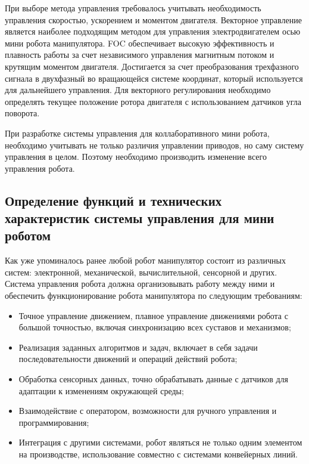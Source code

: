 При выборе метода управления требовалось учитывать необходимость управления скоростью, ускорением и моментом двигателя. 
Векторное управление является наиболее подходящим методом для управления электродвигателем осью мини робота манипулятора. FOC обеспечивает высокую эффективность и плавность работы за счет независимого управления магнитным потоком и крутящим моментом двигателя. Достигается за счет преобразования трехфазного сигнала в двухфазный во вращающейся системе координат, который используется для дальнейшего управления. Для векторного регулирования необходимо определять текущее положение ротора двигателя с использованием датчиков угла поворота.

При разработке системы управления для коллаборативного мини робота, необходимо учитывать не только различия  управлении приводов, но саму систему управления в целом. Поэтому необходимо производить изменение всего управления робота. 


\subsection{Определение функций и технических характеристик системы управления для мини роботом}

Как уже упоминалось ранее любой робот манипулятор состоит из различных систем: электронной, механической, вычислительной, сенсорной и других. Система управления робота должна организовывать работу между ними и обеспечить функционирование робота манипулятора по следующим требованиям:
\begin{itemize}
	\item Точное управление движением, плавное управление движениями робота с
	      большой точностью, включая синхронизацию всех суставов и механизмов;

	\item Реализация заданных алгоритмов и задач, включает в себя задачи
	      последовательности движений и операций действий робота;

	\item Обработка сенсорных данных, точно обрабатывать данные с датчиков для
	      адаптации к изменениям окружающей среды;

	\item Взаимодействие с оператором, возможности для ручного управления и
	      программирования;

	\item Интеграция с другими системами, робот являться не только одним
	      элементом на производстве, использование совместно с системами конвейерных
	      линий.
\end{itemize}


